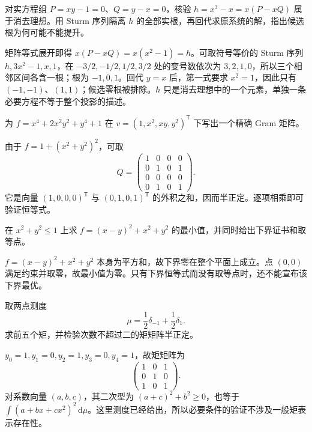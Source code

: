 \begin{exercise}\label{b3:ex:G-eliminate-and-isolate}
	对实方程组 \(P=xy-1=0\)、\(Q=y-x=0\)，核验 \(h=x^3-x=x(P-xQ)\) 属于消去理想。用 Sturm 序列隔离 \(h\) 的全部实根，再回代求原系统的解，指出候选根为何可能不能提升。
\end{exercise}
\begin{solution}
	矩阵等式展开即得 \(x(P-xQ)=x(x^2-1)=h\)。可取符号等价的 Sturm 序列 \(h,3x^2-1,x,1\)，在 \(-3/2,-1/2,1/2,3/2\) 处的变号数依次为 \(3,2,1,0\)，所以三个相邻区间各含一根；根为 \(-1,0,1\)。回代 \(y=x\) 后，第一式要求 \(x^2=1\)，因此只有 \((-1,-1)\)、\((1,1)\)；候选零根被排除。\(h\) 只是消去理想中的一个元素，单独一条必要方程不等于整个投影的描述。
\end{solution}

\begin{exercise}\label{b3:ex:G-gram-exact}
	为 \(f=x^4+2x^2y^2+y^4+1\) 在 \(v=(1,x^2,xy,y^2)^{\mathsf T}\) 下写出一个精确 Gram 矩阵。
\end{exercise}
\begin{solution}
	由于 \(f=1+(x^2+y^2)^2\)，可取
	\[
		Q=\begin{pmatrix}1&0&0&0\\0&1&0&1\\0&0&0&0\\0&1&0&1\end{pmatrix}.
	\]
	它是向量 \((1,0,0,0)^{\mathsf T}\) 与 \((0,1,0,1)^{\mathsf T}\) 的外积之和，因而半正定。逐项相乘即可验证恒等式。
\end{solution}

\begin{exercise}\label{b3:ex:G-certified-minimum}
	在 \(x^2+y^2\le1\) 上求 \(f=(x-y)^2+x^2+y^2\) 的最小值，并同时给出下界证书和取等点。
\end{exercise}
\begin{solution}
	\(f=(x-y)^2+x^2+y^2\) 本身为平方和，故下界零在整个平面上成立。点 \((0,0)\) 满足约束并取零，故最小值为零。只有下界恒等式而没有取等点时，还不能宣布该下界最优。
\end{solution}

\begin{exercise}\label{b3:ex:G-moment-two-points}
	取两点测度
	\[
		\mu=\frac12\delta_{-1}+\frac12\delta_1.
	\]
	求前五个矩，并检验次数不超过二的矩矩阵半正定。
\end{exercise}
\begin{solution}
	\(y_0=1,y_1=0,y_2=1,y_3=0,y_4=1\)，故矩矩阵为
	\[
		\begin{pmatrix}1&0&1\\0&1&0\\1&0&1\end{pmatrix}.
	\]
	对系数向量 \((a,b,c)\)，其二次型为 \((a+c)^2+b^2\ge0\)，也等于 \(\int(a+bx+cx^2)^2\,\mathrm{d}\mu\)。这里测度已经给出，所以必要条件的验证不涉及一般矩表示存在性。
\end{solution}

